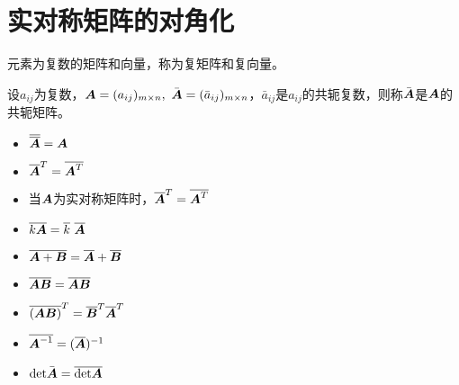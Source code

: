\section{实对称矩阵的对角化}

\begin{frame}  
    \begin{dingyi}
      元素为复数的矩阵和向量，称为复矩阵和复向量。
    \end{dingyi}

    \begin{dingyi}
      设$a_{ij}$为复数，$\boldsymbol{A}=(a_{ij})_{m\times n},~\bar{\boldsymbol{A}}=(\bar a_{ij})_{m\times n}$，$\bar a_{ij}$是$a_{ij}$的共轭复数，则称$\bar {\boldsymbol{A}}$是$\boldsymbol{A}$的共轭矩阵。
    \end{dingyi}


    \begin{itemize}
    \item $\overline {\overline {\boldsymbol{A}}} = \boldsymbol{A}$
    \item ${\overline {\boldsymbol{A}}}^T = \overline{\boldsymbol{A}^T}$
    \item 当$\boldsymbol{A}$为实对称矩阵时，${\overline {\boldsymbol{A}}}^T = \overline{\boldsymbol{A}^T}$
    \end{itemize}
  
\end{frame}

\begin{frame}
  
    \begin{itemize}
    \item $\overline{k\boldsymbol{A}}=\overline k ~\overline {\boldsymbol{A}}$
    \item $\overline{\boldsymbol{A}+\boldsymbol{B}}=\overline {\boldsymbol{A}}+\overline {\boldsymbol{B}}$
    \item $\overline{\boldsymbol{A}\boldsymbol{B}}=\overline {\boldsymbol{A}}\overline {\boldsymbol{B}}$
    \item $\overline{(\boldsymbol{A}\boldsymbol{B})}^T=\overline {\boldsymbol{B}}^T \overline {\boldsymbol{A}}^T$
    \item $\overline{\boldsymbol{A}^{-1}}=(\overline {\boldsymbol{A}})^{-1}$
    \item $\mathrm{det} \bar{\boldsymbol{A}} = \overline{\mathrm{det} \boldsymbol{A}}$
    \end{itemize}
  
\end{frame}



